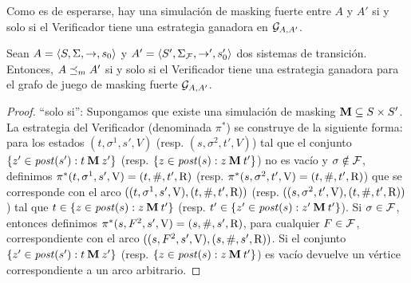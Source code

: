 Como es de esperarse, hay una simulación de masking fuerte entre $A$ y $A'$
si y solo si el Verificador tiene una estrategia ganadora en $\mathcal{G}_{A, A'}$.

\begin{theorem} \label{thm:wingame_strat}
  Sean $A=\langle S, \Sigma, \rightarrow, s_0 \rangle$ y $A'=\langle S', \Sigma_{\mathcal{F}}, \rightarrow', s'_0 \rangle$ dos sistemas de transición.
  Entonces, $A \preceq_{m} A'$ si y solo si el Verificador tiene una estrategia ganadora para el grafo de juego de masking fuerte $\mathcal{G}_{A, A'}$.
\end{theorem}
\begin{proof} 
	``solo si'': Supongamos que existe una simulación de masking $\mathbin{\mathbf{M}} \subseteq S \times S'$.
La estrategia del Verificador (denominada $\pi^*$) se construye de la siguiente forma:  para los estados $(t, \sigma^1, s', V)$ (resp. $(s, \sigma^2, t', V)$) tal que el conjunto $\{ z' \in \mathit{post}(s'): t \mathbin{\mathbf{M}} z' \}$
(resp. $\{ z \in \mathit{post}(s): z \mathbin{\mathbf{M}} t' \}$) no es vacío y $\sigma \notin \mathcal{F}$, definimos $\pi^*(t, \sigma^1, s', \mathrm{V}) = (t, \#, t', \mathrm{R})$ 
(resp. $\pi^*(s, \sigma^2, t', \mathrm{V}) = (t, \#, t', \mathrm{R})$) que se corresponde con el arco $((t, \sigma^1, s', \mathrm{V}), (t, \#, t', \mathrm{R}))$ (resp. $((s, \sigma^2, t', \mathrm{V}),(t, \#, t', \mathrm{R}))$) tal que $t \in \{ z \in \mathit{post}(s): z \mathbin{\mathbf{M}} t' \}$ (resp. $t' \in \{ z' \in \mathit{post}(s): z' \mathbin{\mathbf{M}} t' \}$).  Si $\sigma \in \mathcal{F}$, entonces definimos $\pi^*(s, F^2, s', \mathrm{V}) = (s, \#, s', \mathrm{R})$, para cualquier $F \in \mathcal{F}$, correspondiente con el arco $((s, F^2, s', \mathrm{V}),( s, \#, s', \mathrm{R}))$. Si el conjunto $\{ z' \in \mathit{post}(s'): t \mathbin{\mathbf{M}} z' \}$  (resp. $\{ z \in \mathit{post}(s): z \mathbin{\mathbf{M}} t' \}$) 
es vacío devuelve un vértice correspondiente a un arco arbitrario. 


\end{proof}
